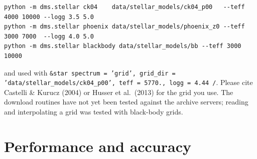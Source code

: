 \documentclass[11pt,a4paper]{article}
\newcommand{\code}[1]{\texttt{#1}}
\begin{document}
\begin{lstlisting}[style=sh]
python -m dms.stellar ck04    data/stellar_models/ck04_p00   --teff 4000 10000 --logg 3.5 5.0
python -m dms.stellar phoenix data/stellar_models/phoenix_z0 --teff 3000 7000  --logg 4.0 5.0
python -m dms.stellar blackbody data/stellar_models/bb --teff 3000 10000
\end{lstlisting}
and used with
\code{\&star spectrum = 'grid', grid\_dir = 'data/stellar\_models/ck04\_p00', teff = 5770.,
logg = 4.44 /}. Please cite Castelli \& Kurucz (2004) or Husser et al.\ (2013) for the grid you
use. The download routines have not yet been tested against the archive servers; reading and
interpolating a grid was tested with black-body grids.

\section{Performance and accuracy}
\label{sec:perf}
\end{document}
